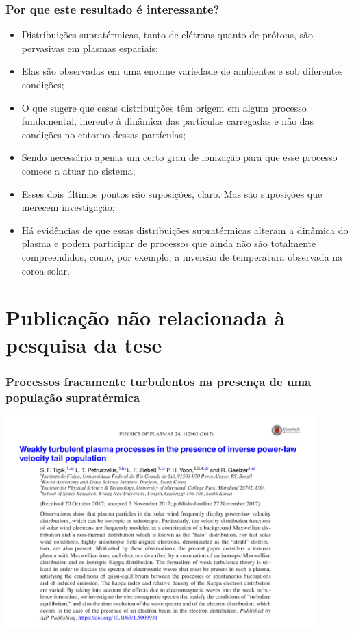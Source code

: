 \documentclass[10pt,aspectratio=1610,lualatex]{beamer}
\begin{document}
\begin{frame}
  \frametitle{Por que este resultado é interessante?}
  \begin{itemize}
    \item Distribuições supratérmicas, tanto de elétrons quanto de prótons,
    são pervasivas em plasmas espaciais;
    \vspace{0.1cm}
    \pause
    \item Elas são observadas em uma enorme variedade de ambientes e sob
    diferentes condições;
    \vspace{0.1cm}
    \pause
    \item O que sugere que essas distribuições têm origem em algum
    processo fundamental, inerente à dinâmica das partículas carregadas
    e não das condições no entorno dessas partículas;
    \vspace{0.1cm}
    \pause
    \item Sendo necessário apenas um certo grau de ionização para que
    esse processo comece a atuar no sistema;
    \vspace{0.1cm}
    \pause
    \item Esses dois últimos pontos são suposições, claro. Mas são suposições
    que merecem investigação;
    \vspace{0.1cm}
    \pause
    \item Há evidências de que essas distribuições supratérmicas alteram a dinâmica
    do plasma e podem participar de processos que ainda não são totalmente
    compreendidos, como, por exemplo, a inversão de temperatura observada na coroa
    solar.
  \end{itemize}
\end{frame}

\section{Publicação não relacionada à pesquisa da tese}
\begin{frame}
  \frametitle{Processos fracamente turbulentos na presença de
    uma população supratérmica}
   \centering \includegraphics[width=0.9\textwidth]{print_Tigik2017b.png}
\end{frame}
\end{document}
